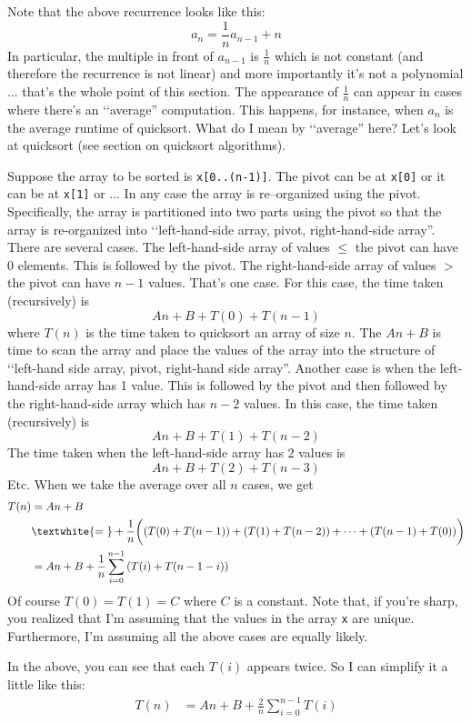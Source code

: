 Note that the above recurrence looks like this:
\[
a_n = \frac{1}{n} a_{n-1} + n
\]
In particular, the multiple in front of $a_{n-1}$ is $\frac{1}{n}$
which is not constant (and therefore the recurrence is
not linear) and more importantly it's not a polynomial ...
that's the whole point of this section.
The appearance of $\frac{1}{n}$ can appear in cases where
there's an \lq\lq average'' computation.
This happens, for instance,
when $a_n$ is the average runtime of quicksort.
What do I mean by \lq\lq average'' here?
Let's look at quicksort (see section on quicksort algorithms).

Suppose the array to be sorted is \verb!x[0..(n-1)]!.
The pivot can be at \verb!x[0]! or it can be at \verb!x[1]! or ...
In any case the array is re--organized using the pivot.
Specifically,
the array is partitioned into two parts using the pivot
so that the array is re-organized into
\lq\lq left-hand-side array, pivot, right-hand-side array''.
There are several cases.
The left-hand-side array of values $\leq$ the pivot can have 0 elements.
This is followed by the pivot.
The right-hand-side array of values $>$ the pivot can have $n - 1$ values.
That's one case.
For this case, the time taken (recursively) is
\[
An + B + T(0) + T(n - 1)
\]
where $T(n)$ is the time taken to quicksort an array of size $n$.
The $An + B$ is time to scan the array
and place the values of the array into the structure
of 
\lq\lq left-hand side array, pivot, right-hand side array''.
Another case is when the left-hand-side array has 1 value.
This is followed by the pivot and then followed by the right-hand-side
array which has $n - 2$ values.
In this case, the time taken (recursively) is
\[
An + B + T(1) + T(n - 2)
\]
The time taken when the left-hand-side array has 2 values is
\[
An + B + T(2) + T(n - 3)
\]
Etc.
When we take the average over all $n$ cases, we get
\begin{align*}
T(n)
&= An + B \\
&\textwhite{= \ }
+ \frac{1}{n} 
\biggl(
  \left( T(0) + T(n-1) \right)
  + \left( T(1) + T(n-2) \right)
  + \cdots
  + \left( T(n - 1) + T(0) \right)
\biggr) \\
&= An + B + \frac{1}{n}\sum_{i=0}^{n-1} \left( T(i) + T(n - 1 - i) \right)
\end{align*}
Of course $T(0) = T(1) = C$ where $C$ is a constant.
Note that, if you're sharp, you realized that I'm assuming that the
values in the array \verb!x! are unique.
Furthermore, I'm assuming all the above cases are equally likely.

In the above, you can see that each $T(i)$ appears twice.
So I can simplify it a little like this:
\begin{align*}
T(n)
&= An + B + \frac{2}{n}\sum_{i=0}^{n-1} T(i)
\end{align*}
